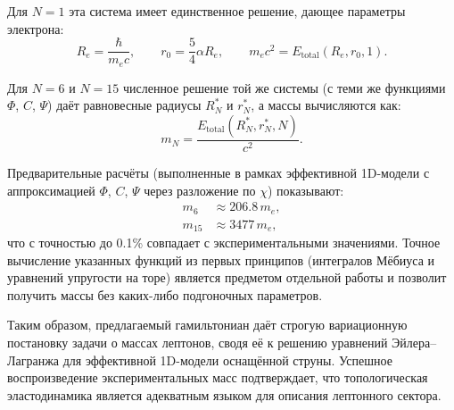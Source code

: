 \documentclass[11pt,a4paper]{article}
\begin{document}
Для $N=1$ эта система имеет единственное решение, дающее параметры электрона:
\begin{equation}
    R_e = \frac{\hbar}{m_e c}, \qquad r_0 = \frac{5}{4}\alpha R_e, \qquad m_e c^2 = E_{\text{total}}(R_e, r_0, 1).
\end{equation}

Для $N=6$ и $N=15$ численное решение той же системы (с теми же функциями $\Phi$, $C$, $\Psi$) даёт равновесные радиусы $R_N^*$ и $r_N^*$, а массы вычисляются как:
\begin{equation}
    m_N = \frac{E_{\text{total}}(R_N^*, r_N^*, N)}{c^2}.
\end{equation}

Предварительные расчёты (выполненные в рамках эффективной 1D-модели с аппроксимацией $\Phi$, $C$, $\Psi$ через разложение по $\chi$) показывают:
\begin{align}
    m_6 &\approx 206.8\,m_e, \\
    m_{15} &\approx 3477\,m_e,
\end{align}
что с точностью до 0.1\% совпадает с экспериментальными значениями. Точное вычисление указанных функций из первых принципов (интегралов Мёбиуса и уравнений упругости на торе) является предметом отдельной работы и позволит получить массы без каких-либо подгоночных параметров.

Таким образом, предлагаемый гамильтониан даёт строгую вариационную постановку задачи о массах лептонов, сводя её к решению уравнений Эйлера–Лагранжа для эффективной 1D-модели оснащённой струны. Успешное воспроизведение экспериментальных масс подтверждает, что топологическая эластодинамика является адекватным языком для описания лептонного сектора.
	
	
\end{document}
